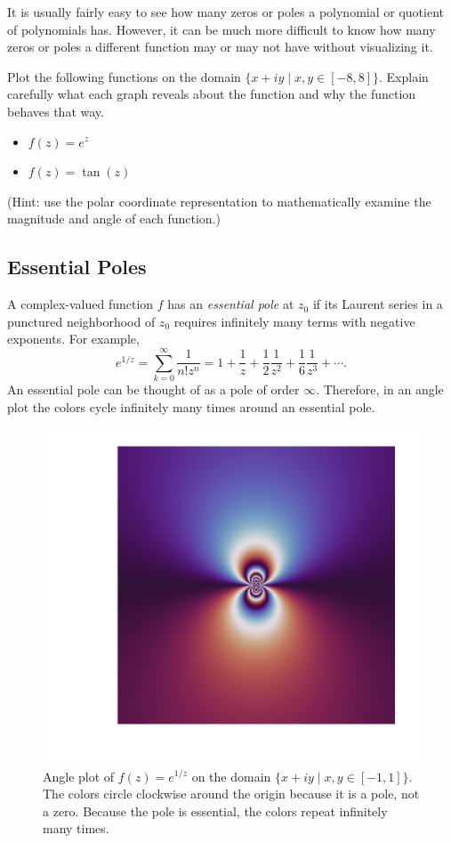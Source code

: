 It is usually fairly easy to see how many zeros or poles a polynomial or quotient of polynomials has.
However, it can be much more difficult to know how many zeros or poles a different function may or may not have without visualizing it.

\begin{problem}
\label{prob:findpz}
Plot the following functions on the domain $\{x+iy\mid x,y\in[-8,8]\}$.
Explain carefully what each graph reveals about the function and why the function behaves that way.
\begin{itemize}
\item $f(z) = e^z$
\item $f(z) = \tan(z)$
\end{itemize}
(Hint: use the polar coordinate representation to mathematically examine the magnitude and angle of each function.)
\end{problem}

\subsection*{Essential Poles} %

A complex-valued function $f$ has an \emph{essential pole} at $z_0$ if its Laurent series in a punctured neighborhood of $z_0$ requires infinitely many terms with negative exponents.
For example,
\[
e^{1/z} = \sum_{k=0}^{\infty}\frac{1}{n! z^n} = 1+\frac{1}{z}+\frac{1}{2}\frac{1}{z^2}+\frac{1}{6}\frac{1}{z^3}+\cdots.
\]
An essential pole can be thought of as a pole of order $\infty$.
Therefore, in an angle plot the colors cycle infinitely many times around an essential pole.

\begin{figure}[H] %
\includegraphics[width=.7\textwidth]{figures/poles_angle.png}
\caption{Angle plot of $f(z) = e^{1/z}$ on the domain $\{x+iy \mid x,y \in [-1,1]\}$.
The colors circle clockwise around the origin because it is a pole, not a zero.
Because the pole is essential, the colors repeat infinitely many times.}
\label{fig:complex-essential-pole}
\end{figure}

